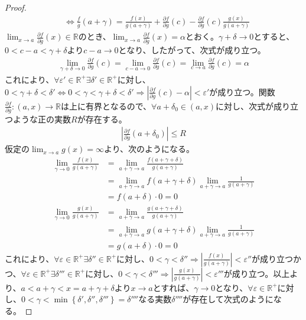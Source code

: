 \documentclass[dvipdfmx]{jsarticle}
\begin{document}
\begin{proof}
\begin{align*}
&\Leftrightarrow \frac{f}{g}\left( a + \gamma \right) = \frac{f(x)}{g\left( a + \gamma \right)} + \frac{\partial f}{\partial g}(c) - \frac{\partial f}{\partial g}(c)\frac{g(x)}{g\left( a + \gamma \right)}
\end{align*}
$\lim_{x \rightarrow a}{\frac{\partial f}{\partial g}(x)} \in \mathbb{R}$のとき、$\lim_{x \rightarrow a}{\frac{\partial f}{\partial g}(x)} = \alpha$とおく。$\gamma + \delta \rightarrow 0$とすると、$0 < c - a < \gamma + \delta$より$c - a \rightarrow 0$となり、したがって、次式が成り立つ。
\begin{align*}
\lim_{\gamma + \delta \rightarrow 0}{\frac{\partial f}{\partial g}(c)} = \lim_{c - a \rightarrow 0}{\frac{\partial f}{\partial g}(c)} = \lim_{c \rightarrow a}{\frac{\partial f}{\partial g}(c)} = \alpha
\end{align*}
これにより、$\forall\varepsilon' \in \mathbb{R}^{+}\exists\delta' \in \mathbb{R}^{+}$に対し、$0 < \gamma + \delta < \delta' \Leftrightarrow 0 < \gamma < \gamma + \delta < \delta' \Rightarrow \left| \frac{\partial f}{\partial g}(c) - \alpha \right| < \varepsilon'$が成り立つ。関数$\frac{\partial f}{\partial g}:(a,x) \rightarrow \mathbb{R}$は上に有界となるので、$\forall a + \delta_{0} \in (a,x)$に対し、次式が成り立つような正の実数$R$が存在する。
\begin{align*}
\left| \frac{\partial f}{\partial g}\left( a + \delta_{0} \right) \right| \leq R
\end{align*}
仮定の$\lim_{x \rightarrow a}{g(x)} = \infty$より、次のようになる。
\begin{align*}
\lim_{\gamma \rightarrow 0}\frac{f(x)}{g\left( a + \gamma \right)} &= \lim_{a + \gamma \rightarrow a}\frac{f\left( a + \gamma + \delta \right)}{g\left( a + \gamma \right)}\\
&= \lim_{a + \gamma \rightarrow a}{f\left( a + \gamma + \delta \right)}\lim_{a + \gamma \rightarrow a}\frac{1}{g\left( a + \gamma \right)}\\
&= f\left( a + \delta \right) \cdot 0 = 0\\
\lim_{\gamma \rightarrow 0}\frac{g(x)}{g\left( a + \gamma \right)} &= \lim_{a + \gamma \rightarrow a}\frac{g\left( a + \gamma + \delta \right)}{g\left( a + \gamma \right)}\\
&= \lim_{a + \gamma \rightarrow a}{g\left( a + \gamma + \delta \right)}\lim_{a + \gamma \rightarrow a}\frac{1}{g\left( a + \gamma \right)}\\
&= g\left( a + \delta \right) \cdot 0 = 0
\end{align*}
これにより、$\forall\varepsilon \in \mathbb{R}^{+}\exists\delta'' \in \mathbb{R}^{+}$に対し、$0 < \gamma < \delta'' \Rightarrow \left| \frac{f(x)}{g\left( a + \gamma \right)} \right| < \varepsilon''$が成り立つかつ、$\forall\varepsilon \in \mathbb{R}^{+}\exists\delta''' \in \mathbb{R}^{+}$に対し、$0 < \gamma < \delta''' \Rightarrow \left| \frac{g(x)}{g\left( a + \gamma \right)} \right| < \varepsilon'''$が成り立つ。以上より、$a < a + \gamma < x = a + \gamma + \delta$より$x \rightarrow a$とすれば、$\gamma \rightarrow 0$となり、$\forall\varepsilon \in \mathbb{R}^{+}$に対し、$0 < \gamma < \min\left\{ \delta',\delta'',\delta''' \right\} = \delta''''$なる実数$\delta''''$が存在して次式のようになる。

\end{proof}
\end{document}
